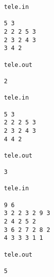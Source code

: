 \begin{verbatim}
tele.in 
 
5 3 
2 2 2 5 3 
2 3 2 4 3 
3 4 2 
 
tele.out 
 
2 

tele.in 
 
5 3 
2 2 2 5 3 
2 3 2 4 3 
4 4 2 
 
tele.out 
 
3 

tele.in 
 
9 6 
3 2 2 3 2 9 3 
2 4 2 5 2 
3 6 2 7 2 8 2 
4 3 3 3 1 1 
 
tele.out 
 
5
\end{verbatim}